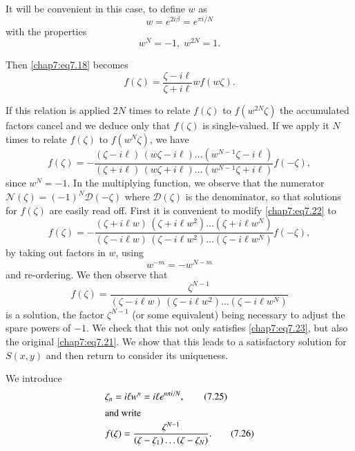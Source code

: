It will be convenient in this case, to define $w$ as 
\begin{equation}
w=e^{2i\beta}=e^{\pi i/N}\tag{7.19}\label{chap7:eq7.19}
\end{equation}
with the properties
\begin{equation}
w^N=-1,\;w^{2N}=1.\tag{7.20}\label{chap7:eq7.20}
\end{equation}

Then \eqref{chap7:eq7.18} becomes
\begin{equation}
f(\zeta)=\frac{\zeta-i\ell}{\zeta+i\ell}wf(w\zeta). \tag{7.21}\label{chap7:eq7.21}
\end{equation}

If this relation is applied $2N$ times to relate $f(\zeta)$ to $f(w^{2N}\zeta)$ the accumulated factors cancel and we deduce only that $f(\zeta)$ is single-valued. If we apply it $N$ times to relate $f(\zeta)$ to $f(w^N\zeta)$, we have 
\begin{equation}
f(\zeta)= -\frac{(\zeta-i\ell)\,(w\zeta-i\ell)\ldots \left(w^{N-1}\zeta-i\ell \right)}{(\zeta+i\ell)\,(w\zeta+i\ell)\ldots\left(w^{N-1}\zeta+i\ell\right)} f(-\zeta),\tag{7.22}\label{chap7:eq7.22}
\end{equation}
since $w^N= -1$. In the multiplying function, we observe that the numerator $\mathscr{N}(\zeta)=(-1)^N\mathscr{D}(-\zeta)$ where $\mathscr{D}(\zeta)$ is the denominator, so that solutions for $f(\zeta)$ are easily read off. First it is convenient to modify \eqref{chap7:eq7.22} to 
\begin{equation}
f(\zeta)= -\frac{(\zeta+i\ell w)\,(\zeta+i\ell w^2)\ldots\left(\zeta+i\ell w^N\right)}{(\zeta-i\ell w)\,(\zeta-i\ell w^2)\ldots\left(\zeta-i\ell w^N\right)}f(-\zeta),\tag{7.23}\label{chap7:eq7.23}
\end{equation}
by taking out factors in $w$, using
$$
w^{-m}= -w^{N-m}
$$
and re-ordering. We then observe that 
\begin{equation}
f(\zeta)=\frac{\zeta^{N-1}}{(\zeta-i\ell w)\,(\zeta-i\ell w^2)\ldots\left(\zeta- i\ell w^N\right)}\tag{7.24}\label{chap7:eq7.24}
\end{equation}\pageoriginale
is a solution, the factor $\zeta^{N-1}$ (or some equivalent) being necessary to adjust the spare powers of $-1$. We check that this not only satisfies \eqref{chap7:eq7.23}, but also the original \eqref{chap7:eq7.21}. We show that this leads to a satisfactory solution for $S(x,y)$ and then return to consider its uniqueness.

We introduce
\begin{align}
& \zeta_n=i\ell w^n=i\ell e^{n\pi i/N},\tag{7.25}\label{chap7:eq7.25}\\
\intertext{and write}
& f(\zeta)=\frac{\zeta^{N-1}}{\left(\zeta-\zeta_1\right)\ldots\left(\zeta- \zeta_N\right)}.\tag{7.26}\label{chap7:eq7.26}
\end{align}

